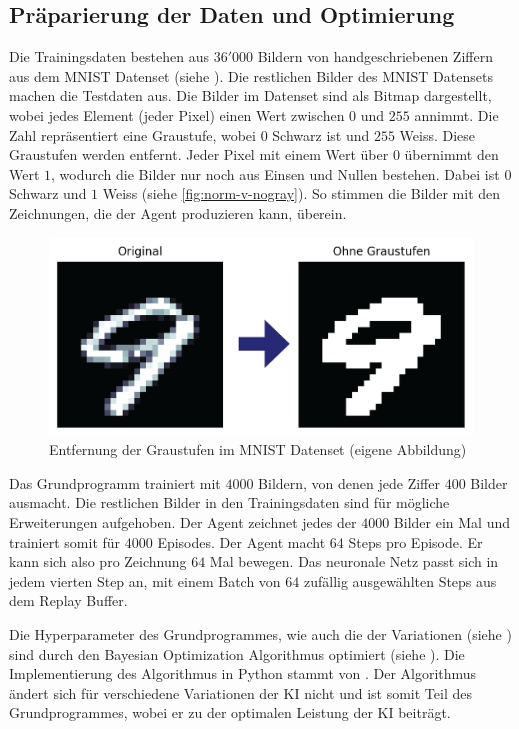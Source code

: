 \subsection{Präparierung der Daten und Optimierung}\label{sub:m_grund_data}
Die Trainingsdaten bestehen aus $36'000$ Bildern von handgeschriebenen Ziffern
aus dem MNIST Datenset (siehe ). Die restlichen Bilder des
MNIST Datensets machen die Testdaten aus. Die Bilder im Datenset sind als Bitmap
dargestellt, wobei jedes Element (jeder Pixel) einen Wert zwischen $0$ und $255$
annimmt. Die Zahl repräsentiert eine Graustufe, wobei $0$ Schwarz ist und $255$
Weiss. Diese Graustufen werden entfernt. Jeder Pixel mit einem Wert über $0$
übernimmt den Wert $1$, wodurch die Bilder nur noch aus Einsen und Nullen
bestehen. Dabei ist $0$ Schwarz und $1$ Weiss (siehe \autoref{fig:norm-v-nogray}).
So stimmen die Bilder mit den Zeichnungen, die der Agent produzieren kann,
überein.

\begin{figure}[!ht]
  \centering
  \includegraphics[width=\textwidth]{images/methode/norm-v-nogray.png}
  \caption{Entfernung der Graustufen im MNIST Datenset (eigene Abbildung)}
  \label{fig:norm-v-nogray}
\end{figure}


Das Grundprogramm trainiert mit $4000$ Bildern, von denen jede Ziffer $400$
Bilder ausmacht. Die restlichen Bilder in den Trainingsdaten sind für mögliche  
Erweiterungen aufgehoben. Der Agent zeichnet jedes der $4000$ Bilder ein Mal und
trainiert somit für $4000$ Episodes. Der Agent macht $64$ Steps pro Episode. Er
kann sich also pro Zeichnung $64$ Mal bewegen. Das neuronale Netz passt sich in
jedem vierten Step an, mit einem Batch von $64$ zufällig ausgewählten Steps aus
dem Replay Buffer.

Die Hyperparameter des Grundprogrammes, wie auch die der Variationen (siehe
) sind durch den Bayesian Optimization Algorithmus optimiert
(siehe ). Die Implementierung des Algorithmus in Python
stammt von \cite{fernando_nogueira_bayesian_2014}. Der Algorithmus ändert sich
für verschiedene Variationen der KI nicht und ist somit Teil des
Grundprogrammes, wobei er zu der optimalen Leistung der KI beiträgt. 

